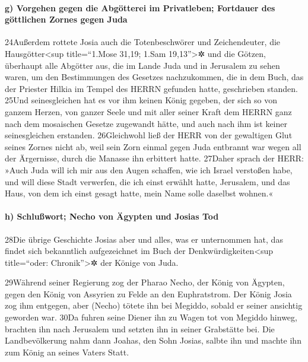 \hypertarget{g-vorgehen-gegen-die-abguxf6tterei-im-privatleben-fortdauer-des-guxf6ttlichen-zornes-gegen-juda}{%
\paragraph{g) Vorgehen gegen die Abgötterei im Privatleben; Fortdauer
des göttlichen Zornes gegen
Juda}\label{g-vorgehen-gegen-die-abguxf6tterei-im-privatleben-fortdauer-des-guxf6ttlichen-zornes-gegen-juda}}

24Außerdem rottete Josia auch die Totenbeschwörer und Zeichendeuter, die
Hausgötter\textless sup title=``1.Mose 31,19; 1.Sam 19,13''\textgreater✲
und die Götzen, überhaupt alle Abgötter aus, die im Lande Juda und in
Jerusalem zu sehen waren, um den Bestimmungen des Gesetzes nachzukommen,
die in dem Buch, das der Priester Hilkia im Tempel des HERRN gefunden
hatte, geschrieben standen. 25Und seinesgleichen hat es vor ihm keinen
König gegeben, der sich so von ganzem Herzen, von ganzer Seele und mit
aller seiner Kraft dem HERRN ganz nach dem mosaischen Gesetze zugewandt
hätte, und auch nach ihm ist keiner seinesgleichen erstanden.
26Gleichwohl ließ der HERR von der gewaltigen Glut seines Zornes nicht
ab, weil sein Zorn einmal gegen Juda entbrannt war wegen all der
Ärgernisse, durch die Manasse ihn erbittert hatte. 27Daher sprach der
HERR: »Auch Juda will ich mir aus den Augen schaffen, wie ich Israel
verstoßen habe, und will diese Stadt verwerfen, die ich einst erwählt
hatte, Jerusalem, und das Haus, von dem ich einst gesagt hatte, mein
Name solle daselbst wohnen.«

\hypertarget{h-schluuxdfwort-necho-von-uxe4gypten-und-josias-tod}{%
\paragraph{h) Schlußwort; Necho von Ägypten und Josias
Tod}\label{h-schluuxdfwort-necho-von-uxe4gypten-und-josias-tod}}

28Die übrige Geschichte Josias aber und alles, was er unternommen hat,
das findet sich bekanntlich aufgezeichnet im Buch der
Denkwürdigkeiten\textless sup title=``oder: Chronik''\textgreater✲ der
Könige von Juda.

29Während seiner Regierung zog der Pharao Necho, der König von Ägypten,
gegen den König von Assyrien zu Felde an den Euphratstrom. Der König
Josia zog ihm entgegen, aber (Necho) tötete ihn bei Megiddo, sobald er
seiner ansichtig geworden war. 30Da fuhren seine Diener ihn zu Wagen tot
von Megiddo hinweg, brachten ihn nach Jerusalem und setzten ihn in
seiner Grabstätte bei. Die Landbevölkerung nahm dann Joahas, den Sohn
Josias, salbte ihn und machte ihn zum König an seines Vaters Statt.

